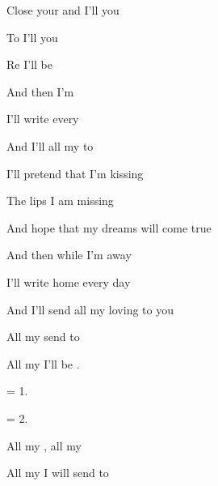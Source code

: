 

\zs
Close your  and I'll  you

To I'll  you

Re I'll  be 

And then  I'm 

I'll write  every 

And I'll  all my  to     
\ks

\zs
I'll pretend that I'm kissing

The lips I am missing

And hope that my dreams will come true

And then while I'm away

I'll write home every day

And I'll send all my loving to you
\ks

\zr
All my   send to 

All my   I'll be .
\kr

\zs
= 1.
\ks

\zs
= 2.
\ks

\zr
All my , all my 

All my  I will send to 
\kr

\kp





